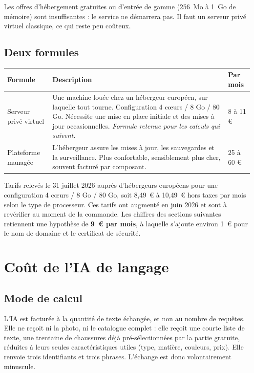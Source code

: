 \documentclass[11pt,a4paper]{article}
\begin{document}
\vspace{1em}
Les offres d'hébergement gratuites ou d'entrée de gamme (256~Mo à 1~Go de
mémoire) sont insuffisantes : le service ne démarrera pas. Il faut un serveur
privé virtuel classique, ce qui reste peu coûteux.

\subsection{Deux formules}

\begin{tabularx}{\textwidth}{L{3.6cm} X L{2.4cm}}
\toprule
\textbf{Formule} & \textbf{Description} & \textbf{Par mois} \\
\midrule
Serveur privé virtuel &
Une machine louée chez un hébergeur européen, sur laquelle tout tourne.
Configuration 4 cœurs / 8 Go / 80 Go. Nécessite une mise en place initiale et
des mises à jour occasionnelles. \emph{Formule retenue pour les calculs qui
suivent.} &
8 à 11 € \\
\addlinespace
Plateforme managée &
L'hébergeur assure les mises à jour, les sauvegardes et la surveillance. Plus
confortable, sensiblement plus cher, souvent facturé par composant. &
25 à 60 € \\
\bottomrule
\end{tabularx}

\vspace{0.8em}
\noindent
{\small Tarifs relevés le 31 juillet 2026 auprès d'hébergeurs européens pour une
configuration 4 cœurs / 8 Go / 80 Go, soit 8,49~€ à 10,49~€ hors taxes par mois
selon le type de processeur. Ces tarifs ont augmenté en juin 2026 et sont à
revérifier au moment de la commande. Les chiffres des sections suivantes
retiennent une hypothèse de \textbf{9~€ par mois}, à laquelle s'ajoute environ
1~€ pour le nom de domaine et le certificat de sécurité.}

\newpage
\section{Coût de l'IA de langage}
\label{sec:llm}

\subsection{Mode de calcul}

L'IA est facturée à la quantité de texte échangée, et non au nombre de
requêtes. Elle ne reçoit ni la photo, ni le catalogue complet : elle reçoit une
courte liste de texte, une trentaine de chaussures déjà pré-sélectionnées par la
partie gratuite, réduites à leurs seules caractéristiques utiles (type, matière,
couleurs, prix). Elle renvoie trois identifiants et trois phrases. L'échange est
donc volontairement minuscule.
\end{document}
